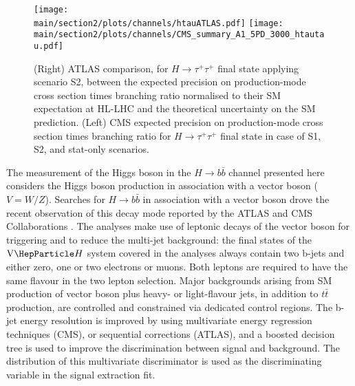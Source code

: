  \begin{figure}[h!]
\begin{center}
\texttt{[image: \\main/section2/plots/channels/htauATLAS.pdf]}
\texttt{[image: \\main/section2/plots/channels/CMS\_summary\_A1\_5PD\_3000\_htautau.pdf]}
\end{center}
\caption{(Right) ATLAS comparison, for $H \to \tau^{+}\tau^{+}$ final state applying scenario S2, between the expected precision on production-mode cross section times branching ratio normalised to their SM expectation at HL-LHC and the theoretical uncertainty on the SM prediction. (Left) CMS expected precision on production-mode cross section times branching ratio for $H \to \tau^{+}\tau^{+}$ final state in case of S1, S2, and stat-only scenarios.
}
\label{fig:htt_proj}
\end{figure}



The measurement of the Higgs boson  in the $H \to b\bar{b}$ channel presented here considers the Higgs boson production in association with a vector boson ($V=W/Z$). 
Searches for $H \to b\bar{b}$  in association with a vector boson drove the recent observation  of this decay mode reported by the ATLAS and CMS Collaborations \cite{Aaboud:2018zhk,Sirunyan:2018kst}.
The analyses make use of leptonic decays of the vector boson for triggering and to reduce the multi-jet background: the final states
of the $\vh$ system covered in the analyses always contain two b-jets and either zero, one or two electrons or muons. Both leptons are required to have the same flavour in the two lepton selection.
Major backgrounds arising from SM production of vector boson plus heavy- or light-flavour jets, in addition to $t\bar{t}$ production, are 
controlled and constrained via dedicated control regions. The  b-jet energy resolution is improved by using multivariate energy regression techniques (CMS), or sequential corrections (ATLAS), and a boosted decision tree is used to improve the discrimination 
between signal and background. The distribution of this multivariate discriminator is used as the discriminating
variable in the signal extraction fit. 

